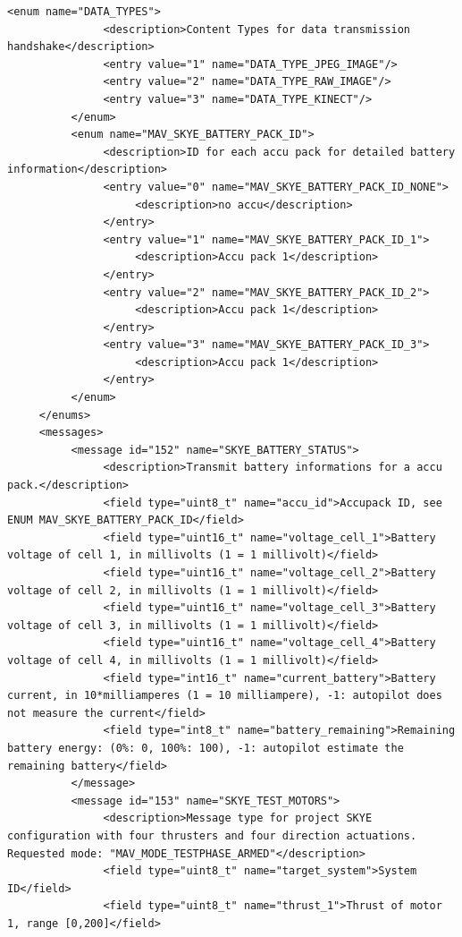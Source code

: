 \begin{lstlisting}[captionpos=b, caption="Definition of \textsc{Skye} specific Mavlink messages", label=app_xml]
          <enum name="DATA_TYPES">
               <description>Content Types for data transmission handshake</description>
               <entry value="1" name="DATA_TYPE_JPEG_IMAGE"/>
               <entry value="2" name="DATA_TYPE_RAW_IMAGE"/>
               <entry value="3" name="DATA_TYPE_KINECT"/>
          </enum>
          <enum name="MAV_SKYE_BATTERY_PACK_ID">
               <description>ID for each accu pack for detailed battery information</description>
               <entry value="0" name="MAV_SKYE_BATTERY_PACK_ID_NONE">
                    <description>no accu</description>
               </entry>
               <entry value="1" name="MAV_SKYE_BATTERY_PACK_ID_1">
                    <description>Accu pack 1</description>
               </entry>
               <entry value="2" name="MAV_SKYE_BATTERY_PACK_ID_2">
                    <description>Accu pack 1</description>
               </entry>
               <entry value="3" name="MAV_SKYE_BATTERY_PACK_ID_3">
                    <description>Accu pack 1</description>
               </entry>
          </enum>
     </enums>
     <messages>
          <message id="152" name="SKYE_BATTERY_STATUS">
               <description>Transmit battery informations for a accu pack.</description>
               <field type="uint8_t" name="accu_id">Accupack ID, see ENUM MAV_SKYE_BATTERY_PACK_ID</field>
               <field type="uint16_t" name="voltage_cell_1">Battery voltage of cell 1, in millivolts (1 = 1 millivolt)</field>
               <field type="uint16_t" name="voltage_cell_2">Battery voltage of cell 2, in millivolts (1 = 1 millivolt)</field>
               <field type="uint16_t" name="voltage_cell_3">Battery voltage of cell 3, in millivolts (1 = 1 millivolt)</field>
               <field type="uint16_t" name="voltage_cell_4">Battery voltage of cell 4, in millivolts (1 = 1 millivolt)</field>
               <field type="int16_t" name="current_battery">Battery current, in 10*milliamperes (1 = 10 milliampere), -1: autopilot does not measure the current</field>
               <field type="int8_t" name="battery_remaining">Remaining battery energy: (0%: 0, 100%: 100), -1: autopilot estimate the remaining battery</field>
          </message>
          <message id="153" name="SKYE_TEST_MOTORS">
               <description>Message type for project SKYE configuration with four thrusters and four direction actuations. Requested mode: "MAV_MODE_TESTPHASE_ARMED"</description>
               <field type="uint8_t" name="target_system">System ID</field>
               <field type="uint8_t" name="thrust_1">Thrust of motor 1, range [0,200]</field>

\end{lstlisting}
